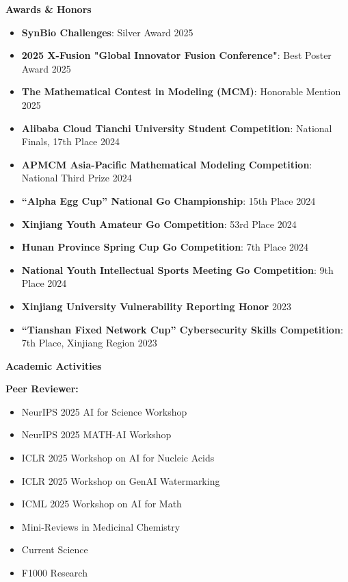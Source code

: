 \documentclass[11pt]{article}
\begin{document}
	\vspace{12pt}
	
	\begin{center}
		\textbf{\large Awards \& Honors}
	\end{center}
	\begin{itemize}[noitemsep, topsep=0pt, partopsep=0pt, parsep=0pt, leftmargin=*]
		\item \textbf{SynBio Challenges}: Silver Award \hfill 2025
		\item \textbf{2025 X-Fusion "Global Innovator Fusion Conference"}: Best Poster Award \hfill 2025
		\item \textbf{The Mathematical Contest in Modeling (MCM)}: Honorable Mention \hfill 2025
		\item \textbf{Alibaba Cloud Tianchi University Student Competition}: National Finals, 17th Place \hfill 2024
		\item \textbf{APMCM Asia-Pacific Mathematical Modeling Competition}: National Third Prize \hfill 2024
		\item \textbf{“Alpha Egg Cup” National Go Championship}: 15th Place \hfill 2024
		\item \textbf{Xinjiang Youth Amateur Go Competition}: 53rd Place \hfill 2024
		\item \textbf{Hunan Province Spring Cup Go Competition}: 7th Place \hfill 2024
		\item \textbf{National Youth Intellectual Sports Meeting Go Competition}: 9th Place \hfill 2024
		\item \textbf{Xinjiang University Vulnerability Reporting Honor} \hfill 2023
		\item \textbf{“Tianshan Fixed Network Cup” Cybersecurity Skills Competition}: 7th Place, Xinjiang Region \hfill 2023
	\end{itemize}

	\clearpage
	\begin{center}
		\textbf{\large Academic Activities}
	\end{center}
	\textbf{Peer Reviewer:}
	\begin{multicols}{2}
		\begin{itemize}[noitemsep, topsep=0pt, partopsep=0pt, parsep=0pt, leftmargin=*]
			\item NeurIPS 2025 AI for Science Workshop
			\item NeurIPS 2025 MATH-AI Workshop
			\item ICLR 2025 Workshop on AI for Nucleic Acids
			\item ICLR 2025 Workshop on GenAI Watermarking
			\item ICML 2025 Workshop on AI for Math
			\item Mini-Reviews in Medicinal Chemistry
			\item Current Science
			\item F1000 Research
		\end{itemize}
	\end{multicols}
	
\end{document}
